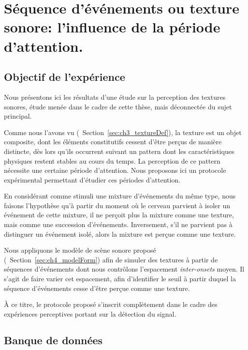\chapter[Expérience annexe: période d'attention]{Séquence d'événements ou texture sonore: l'influence de la période d'attention.}
\label{app:xp_texture}

\section{Objectif de l'expérience}

Nous présentons ici les résultats d'une étude sur la perception des textures sonores, étude menée dans le cadre de cette thèse, mais déconnectée du sujet principal. 

Comme nous l'avons vu (\cf~Section~\ref{sec:ch3_textureDef}), la texture est un objet composite, dont les éléments constitutifs cessent d'être perçus de manière distincte, dès lors qu'ils occurrent suivant un pattern dont les caractéristiques physiques restent stables au cours du temps. La perception de ce pattern nécessite une certaine période d'attention. Nous proposons ici un protocole expérimental permettant d'étudier ces périodes d'attention.


En considérant comme stimuli une mixture d'événements du même type, nous faisons l'hypothèse qu'à partir du moment où le cerveau parvient à isoler un événement de cette mixture, il ne perçoit plus la mixture comme une texture, mais comme une succession d'événements. Inversement, s'il ne parvient pas à distinguer un événement isolé, alors la mixture est perçue comme une texture.

Nous appliquons le modèle de scène sonore proposé (\cf~Section~\ref{sec:ch4_modelForm}) afin de simuler des textures à partir de séquences d'événements dont nous contrôlons l'espacement \emph{inter-onsets} moyen. Il s'agit de faire varier cet espacement, afin d’identifier le seuil à partir duquel la séquence d'événements cesse d'être perçue comme une texture. 

À ce titre, le protocole proposé s'inscrit complètement dans le cadre des expériences perceptives portant sur la détection du signal.

\section{Banque de données}


